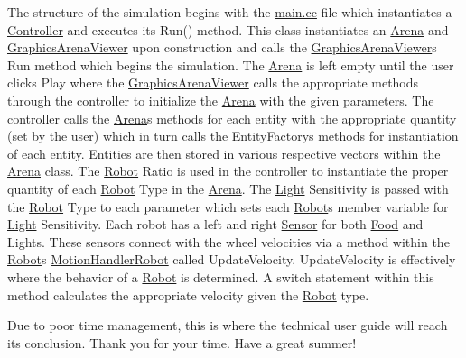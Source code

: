 The structure of the simulation begins with the \hyperlink{main_8cc}{main.\+cc} file which instantiates a \hyperlink{classController}{Controller} and executes its Run() method. This class instantiates an \hyperlink{classArena}{Arena} and \hyperlink{classGraphicsArenaViewer}{Graphics\+Arena\+Viewer} upon construction and calls the \hyperlink{classGraphicsArenaViewer}{Graphics\+Arena\+Viewer}\textquotesingle{}s Run method which begins the simulation. The \hyperlink{classArena}{Arena} is left empty until the user clicks Play where the \hyperlink{classGraphicsArenaViewer}{Graphics\+Arena\+Viewer} calls the appropriate methods through the controller to initialize the \hyperlink{classArena}{Arena} with the given parameters. The controller calls the \hyperlink{classArena}{Arena}\textquotesingle{}s methods for each entity with the appropriate quantity (set by the user) which in turn calls the \hyperlink{classEntityFactory}{Entity\+Factory}\textquotesingle{}s methods for instantiation of each entity. Entities are then stored in various respective vectors within the \hyperlink{classArena}{Arena} class. The \hyperlink{classRobot}{Robot} Ratio is used in the controller to instantiate the proper quantity of each \hyperlink{classRobot}{Robot} Type in the \hyperlink{classArena}{Arena}. The \hyperlink{classLight}{Light} Sensitivity is passed with the \hyperlink{classRobot}{Robot} Type to each parameter which sets each \hyperlink{classRobot}{Robot}\textquotesingle{}s member variable for \hyperlink{classLight}{Light} Sensitivity. Each robot has a left and right \hyperlink{classSensor}{Sensor} for both \hyperlink{classFood}{Food} and Lights. These sensors connect with the wheel velocities via a method within the \hyperlink{classRobot}{Robot}\textquotesingle{}s \hyperlink{classMotionHandlerRobot}{Motion\+Handler\+Robot} called Update\+Velocity. Update\+Velocity is effectively where the behavior of a \hyperlink{classRobot}{Robot} is determined. A switch statement within this method calculates the appropriate velocity given the \hyperlink{classRobot}{Robot} type.

Due to poor time management, this is where the technical user guide will reach its conclusion. Thank you for your time. Have a great summer! 